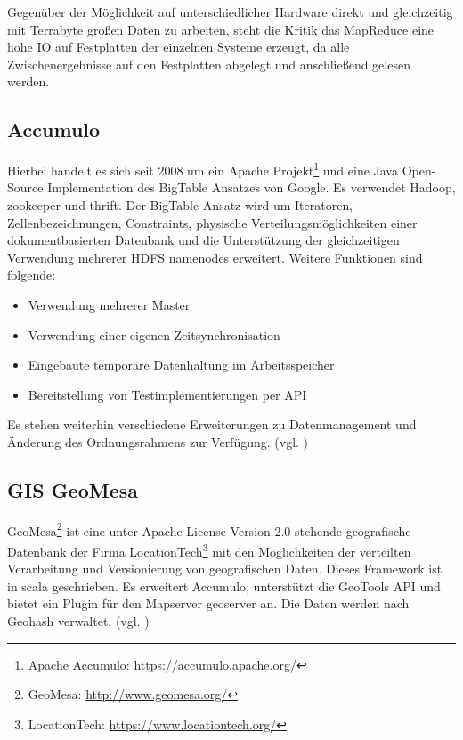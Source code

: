 Gegenüber der Möglichkeit auf unterschiedlicher Hardware direkt und gleichzeitig mit Terrabyte großen Daten zu arbeiten, steht die Kritik das MapReduce eine hohe IO auf Festplatten der einzelnen Systeme erzeugt, da alle Zwischenergebnisse auf den Festplatten abgelegt und anschließend gelesen werden.

\subsection{Accumulo}
\label{accumulo}
Hierbei handelt es sich seit 2008 um ein Apache Projekt\footnote{Apache Accumulo: \url{https://accumulo.apache.org/}} und eine Java Open-Source Implementation des BigTable Ansatzes von Google.
Es verwendet Hadoop, \Gls{zookeeper} und \Gls{thrift}.
Der BigTable Ansatz wird um Iteratoren, Zellenbezeichnungen, Constraints, physische Verteilungsmöglichkeiten einer dokumentbasierten Datenbank und die Unterstützung der gleichzeitigen Verwendung mehrerer HDFS namenodes erweitert.
Weitere Funktionen sind folgende:
\begin{itemize}
\item Verwendung mehrerer Master
\item Verwendung einer eigenen Zeitsynchronisation
\item Eingebaute temporäre Datenhaltung im Arbeitsspeicher
\item Bereitstellung von Testimplementierungen per API
\end {itemize}
Es stehen weiterhin verschiedene Erweiterungen zu Datenmanagement und Änderung des Ordnungsrahmens zur Verfügung. (vgl. \cite{website:accumulo_features})

\subsection{GIS GeoMesa}
GeoMesa\footnote{GeoMesa: \url{http://www.geomesa.org/}} ist eine unter Apache License Version 2.0 stehende geografische Datenbank der Firma LocationTech\footnote{LocationTech: \url{https://www.locationtech.org/}} mit den Möglichkeiten der verteilten Verarbeitung und Versionierung von geografischen Daten.
Dieses Framework ist in \Gls{scala} geschrieben.
Es erweitert Accumulo, unterstützt die GeoTools API und bietet ein Plugin für den Mapserver \Gls{geoserver} an.
Die Daten werden nach Geohash %
verwaltet. (vgl. \cite{website:geomesaeclipse})

